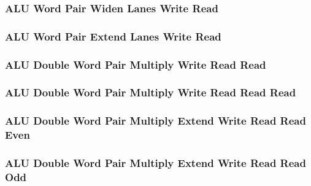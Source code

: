 \subsubsection[{\small ALU Word Pair Widen Lanes Write Read}]{ALU Word Pair Widen Lanes Write Read} \label{sec:format-ALU-DPWIDEWR}



\subsubsection[{\small ALU Word Pair Extend Lanes Write Read}]{ALU Word Pair Extend Lanes Write Read} \label{sec:format-ALU-DPEXTLWR}



\subsubsection[{\small ALU Double Word Pair Multiply Write Read Read}]{ALU Double Word Pair Multiply Write Read Read} \label{sec:format-ALU-DPMWRR}



\subsubsection[{\small ALU Double Word Pair Multiply Write Read Read Read}]{ALU Double Word Pair Multiply Write Read Read Read} \label{sec:format-ALU-DPMWRRR}



\subsubsection[{\small ALU Double Word Pair Multiply Extend Write Read Read Even}]{ALU Double Word Pair Multiply Extend Write Read Read Even} \label{sec:format-ALU-DPMEWRRE}



\subsubsection[{\small ALU Double Word Pair Multiply Extend Write Read Read Odd}]{ALU Double Word Pair Multiply Extend Write Read Read Odd} \label{sec:format-ALU-DPMEWRRO}


